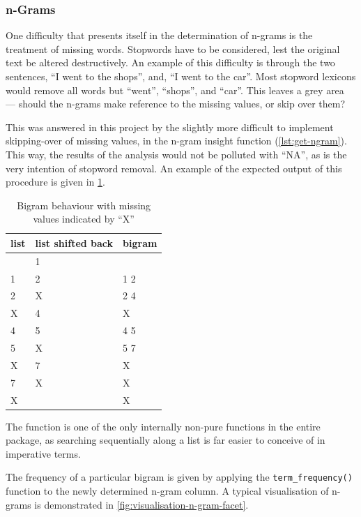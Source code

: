 \documentclass[11pt, a4paper, twoside, titlepage]{report}
\begin{document}
\subsubsection{n-Grams}\label{sec:n-grams}

One difficulty that presents itself in the determination of n-grams is
the treatment of missing words. Stopwords have to be considered, lest
the original text be altered destructively. An example of this
difficulty is through the two sentences, ``I went to the shops'', and,
``I went to the car''. Most stopword lexicons would remove all words
but ``went'', ``shops'', and ``car''. This leaves a grey area ---
should the n-grams make reference to the missing values, or skip over
them?

This was answered in this project by the slightly more difficult to
implement skipping-over of missing values, in the n-gram insight
function (\cref{lst:get-ngram}). This way, the results of the
analysis would not be polluted with ``NA'', as is the very intention
of stopword removal. An example of the expected output of this
procedure is given in \cref{tab:bigram-miss-val}.

\begin{table}
  \centering
\begin{tabular}{lll}
  list & list shifted back & bigram \\
  \midrule
       & 1                 &        \\
  1    & 2                 & 1 2    \\
  2    & X                 & 2 4    \\
  X    & 4                 & X      \\
  4    & 5                 & 4 5    \\
  5    & X                 & 5 7    \\
  X    & 7                 & X      \\
  7    & X                 & X      \\
  X    &                   & X      \\
\end{tabular}
\caption{Bigram behaviour with missing values indicated by ``X''\label{tab:bigram-miss-val}}
\end{table}

The function is one of the only internally non-pure functions in the
entire package, as searching sequentially along a list is far easier
to conceive of in imperative terms.

The frequency of a particular bigram is given by applying the
\texttt{term_frequency()} function to the newly determined
n-gram column. A typical visualisation of n-grams is demonstrated in
\cref{fig:visualisation-n-gram-facet}.
\end{document}
